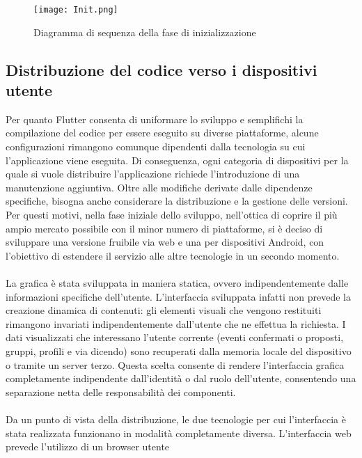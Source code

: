 \begin{figure}[h!]
    \begin{center}
        \texttt{[image: Init.png]}
        \caption{Diagramma di sequenza della fase di inizializzazione }
    \end{center}
\end{figure}


\clearpage

\subsection{Distribuzione del codice verso i dispositivi utente}

Per quanto Flutter consenta di uniformare lo sviluppo e
semplifichi la compilazione del codice per essere eseguito su diverse piattaforme,
alcune configurazioni rimangono comunque dipendenti
dalla tecnologia su cui l'applicazione viene eseguita.
Di conseguenza, 
ogni categoria di dispositivi per la quale si vuole distribuire l'applicazione 
richiede l'introduzione di una manutenzione aggiuntiva.
Oltre alle modifiche derivate dalle dipendenze specifiche,
bisogna anche considerare la distribuzione e la gestione delle versioni.
Per questi motivi, nella fase iniziale dello sviluppo,
nell'ottica di coprire il più ampio mercato possibile con il minor numero di piattaforme,
si è deciso di sviluppare una versione fruibile via web e una per dispositivi Android,
con l'obiettivo di estendere il servizio alle altre tecnologie in un secondo momento.\\
\\
La grafica è stata sviluppata in maniera statica,
ovvero indipendentemente dalle informazioni specifiche dell'utente.
L'interfaccia sviluppata infatti non prevede la creazione dinamica di contenuti:
gli elementi visuali che vengono restituiti rimangono invariati
indipendentemente dall'utente che ne effettua la richiesta.
I dati visualizzati che interessano l'utente corrente
(eventi confermati o proposti, gruppi, profili e via dicendo)
sono recuperati dalla memoria locale del dispositivo o tramite un server terzo.
Questa scelta consente di rendere l'interfaccia grafica completamente
indipendente dall'identità o dal ruolo dell'utente,
consentendo una separazione netta delle responsabilità dei componenti.\\
\\
Da un punto di vista della distribuzione,
le due tecnologie per cui l'interfaccia è stata realizzata
funzionano in modalità completamente diversa.
L'interfaccia web prevede l'utilizzo di un browser utente
